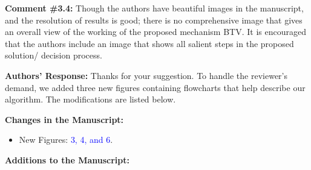 \vspace{\baselineskip}

\begin{mdframed}[style=review] 
\textbf{Comment \#3.4:} Though the authors have beautiful images in the manuscript, and the resolution of results is good; there is no comprehensive image that gives an overall view of the working of the proposed mechanism BTV. It is encouraged that the authors include an image that shows all salient steps in the proposed solution/ decision process.
\end{mdframed}

\textbf{Authors' Response:} Thanks for your suggestion. To handle the reviewer's demand, we added three new figures containing flowcharts that help describe our algorithm. The modifications are listed below.

\textbf{Changes in the Manuscript:} 

\begin{itemize}
    \item New Figures: \textcolor{blue}{3, 4, and 6}.
\end{itemize}

\textbf{Additions to the Manuscript:} 

